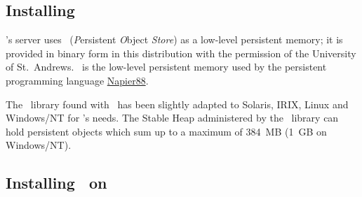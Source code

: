 \subsection[Installing POSTORE]%
{Installing \protect\postore}\label{sec:postore}

\plob's server uses \postore\ (\textit{P}ersistent \textit{O}bject
\textit{Store}) as a low-level persistent memory; it is provided in
binary form in this distribution with the permission of the University
of St.\ Andrews.  \postore\ is the low-level persistent memory used by
the persistent programming language
\href{http://www-ppg.dcs.st-andrews.ac.uk}{Napier88}.

The \postore\ library found with \plob\ has been slightly adapted to
Solaris, IRIX, Linux and Windows/NT for \plob's needs. The Stable Heap
administered by the \postore\ library can hold persistent objects
which sum up to a maximum of 384~MB (1~GB on Windows/NT).

\subsection[Installing PLOB on Unix]%
{Installing \protect\plob\ on \protect\unix}%
\label{sec:install}

